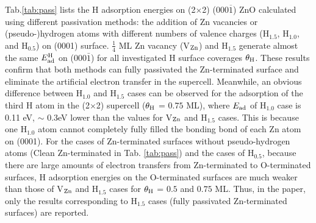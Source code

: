 Tab.\ref{tab:pass} lists the H adsorption energies on (2$\times$2) (000$\overline{1}$) ZnO calculated using different passivation methods: the addition of Zn vacancies or (pseudo-)hydrogen atoms with different numbers of valence charges (H$_{1.5}$, H$_{1.0}$, and H$_{0.5}$) on (0001) surface. 
$\frac{1}{4}$ ML Zn vacancy (V$_{\textup{Zn}}$) and H$_{1.5}$ generate almost the same $E_{\textup{ad}}^{\textup{H}}$ on (000$\bar{1}$) for all investigated H surface coverages $\theta_{\textup{H}}$. These results confirm that both methods can fully passivated the Zn-terminated surface and eliminate the artificial electron transfer in the supercell. Meanwhile, an obvious difference between  H$_{1.0}$ and H$_{1.5}$ cases can be observed for the adsorption of the third H atom in the (2$\times$2) supercell ($\theta_{\textup{H}}$ = $0.75$ ML), where $E_{\textup{ad}}$ of H$_{1.0}$ case is 0.11 eV, $\sim$ 0.3eV lower than the values for V$_{\textup{Zn}}$ and H$_{1.5}$ cases. This is because one H$_{1.0}$ atom cannot completely fully filled the bonding bond of each Zn atom on (0001). For the cases of Zn-terminated surfaces without pseudo-hydrogen atoms (Clean Zn-terminated in Tab. \ref{tab:pass}) and the cases of H$_{0.5}$, because there are large amounts of electron transfers from Zn-terminated to O-terminated surfaces, H adsorption energies on the O-terminated surfaces are much weaker than those of V$_{\textup{Zn}}$ and H$_{1.5}$ cases for $\theta_{\textup{H}}$ = $0.5$ and $0.75$ ML. Thus, in the paper, only the results corresponding to H$_{1.5}$ cases (fully passivated Zn-terminated surfaces) are reported.